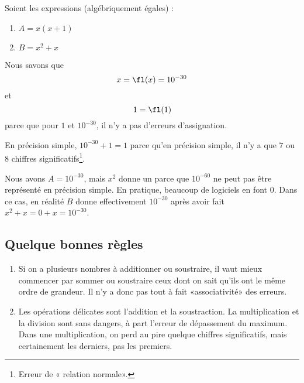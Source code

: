 \begin{example}
	Soient les expressions (algébriquement égales) :
	\begin{enumerate}
		\item
			\(A= x(x+1)\)
		\item
			\(B= x^2+x\)
	\end{enumerate}
	Nous savons que
	\begin{equation}
		x=\fl(x)=10^{-30}
	\end{equation}
	et
	\begin{equation}
		1=\fl(1)
	\end{equation}
	parce que pour \( 1\) et \( 10^{-30}\), il n'y a pas d'erreurs d'assignation.

	En précision simple, \( 10^{-30}+1=1\) parce qu'en précision simple, il n'y a que \( 7\) ou \( 8\) chiffres significatifs\footnote{Erreur de « relation normale».}.

	Nous avons $A=10^{-30}$, mais \( x^2\) donne un  parce que \( 10^{-60}\) ne peut pas être représenté en précision simple. En pratique, beaucoup de logiciels en font \( 0\). Dans ce cas, en réalité \( B\) donne effectivement \( 10^{-30}\) après avoir fait \( x^2+x=0+x=10^{-30}\).
\end{example}

\subsection{Quelque bonnes règles}

\begin{enumerate}
	\item
		Si on a plusieurs nombres à additionner ou soustraire, il vaut mieux commencer par sommer ou soustraire ceux dont on sait qu'ils ont le même ordre de grandeur. Il n'y a donc pas tout à fait «associativité» des erreurs.
	\item
		Les opérations délicates sont l'addition et la soustraction. La multiplication et la division sont sans dangers, à part l'erreur de dépassement du maximum. Dans une multiplication, on perd au pire quelque chiffres significatifs, mais certainement les derniers, pas les premiers.
\end{enumerate}


